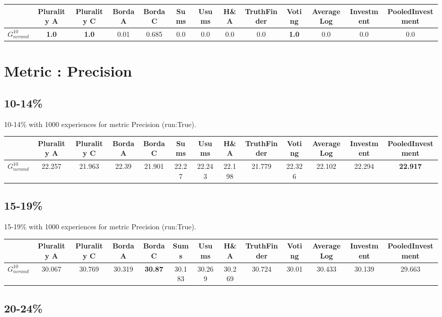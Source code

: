 \documentclass{article}
\newcommand{\graph}[2]{$G_{#1}^{#2}$}
\begin{document}
\noindent\begin{tabular}{|l|c|c|c|c|c|c|c|c|c|c|c|c|}
\hline
& Plurality A& Plurality C& Borda A& Borda C& Sums& Usums& H\&A& TruthFinder& Voting& AverageLog& Investment& PooledInvestment\\
\hline
\graph{ncrand}{10} &\textbf{1.0}&\textbf{1.0}&0.01&0.685&0.0&0.0&0.0&0.0&\textbf{1.0}&0.0&0.0&0.0\\
\hline
\end{tabular}
\newpage
\newpage
\section{Metric : Precision}

\newpage

\subsection{10-14\%}

10-14\% with 1000 experiences for metric Precision (run:True).

\noindent\begin{tabular}{|l|c|c|c|c|c|c|c|c|c|c|c|c|}
\hline
& Plurality A& Plurality C& Borda A& Borda C& Sums& Usums& H\&A& TruthFinder& Voting& AverageLog& Investment& PooledInvestment\\
\hline
\graph{ncrand}{10} &22.257&21.963&22.39&21.901&22.27&22.243&22.198&21.779&22.326&22.102&22.294&\textbf{22.917}\\
\hline
\end{tabular}
\newpage

\subsection{15-19\%}

15-19\% with 1000 experiences for metric Precision (run:True).

\noindent\begin{tabular}{|l|c|c|c|c|c|c|c|c|c|c|c|c|}
\hline
& Plurality A& Plurality C& Borda A& Borda C& Sums& Usums& H\&A& TruthFinder& Voting& AverageLog& Investment& PooledInvestment\\
\hline
\graph{ncrand}{10} &30.067&30.769&30.319&\textbf{30.87}&30.183&30.269&30.269&30.724&30.01&30.433&30.139&29.663\\
\hline
\end{tabular}
\newpage

\subsection{20-24\%}
\end{document}
